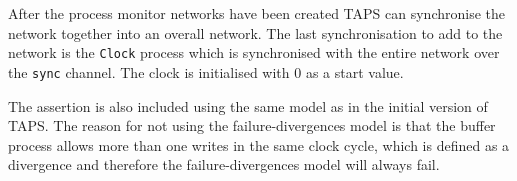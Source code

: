 After the process monitor networks have been created TAPS can synchronise the network together into an overall network.
The last synchronisation to add to the network is the \texttt{Clock} process which is synchronised with the entire network over the \texttt{sync} channel. The clock is initialised with 0 as a start value.

The assertion is also included using the same model as in the initial version of TAPS. The reason for not using the failure-divergences model is that the buffer process allows more than one writes in the same clock cycle, which is defined as a divergence and therefore the failure-divergences model will always fail.


%


